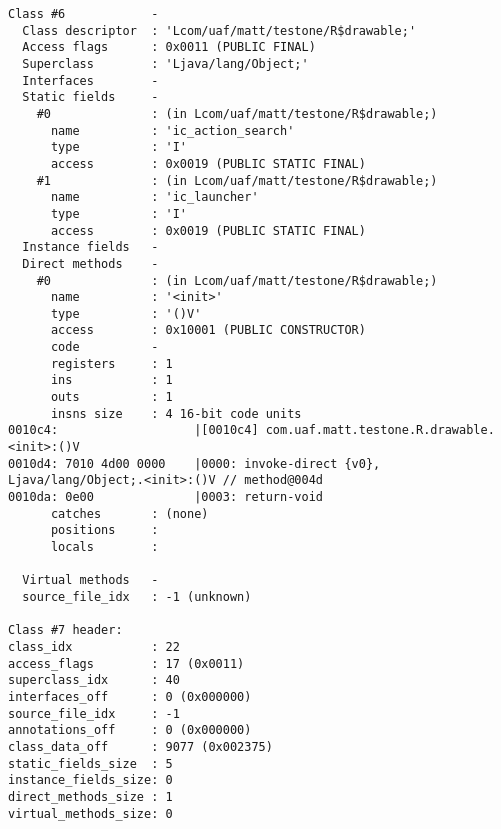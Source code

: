 \begin{lstlisting}
Class #6            -
  Class descriptor  : 'Lcom/uaf/matt/testone/R$drawable;'
  Access flags      : 0x0011 (PUBLIC FINAL)
  Superclass        : 'Ljava/lang/Object;'
  Interfaces        -
  Static fields     -
    #0              : (in Lcom/uaf/matt/testone/R$drawable;)
      name          : 'ic_action_search'
      type          : 'I'
      access        : 0x0019 (PUBLIC STATIC FINAL)
    #1              : (in Lcom/uaf/matt/testone/R$drawable;)
      name          : 'ic_launcher'
      type          : 'I'
      access        : 0x0019 (PUBLIC STATIC FINAL)
  Instance fields   -
  Direct methods    -
    #0              : (in Lcom/uaf/matt/testone/R$drawable;)
      name          : '<init>'
      type          : '()V'
      access        : 0x10001 (PUBLIC CONSTRUCTOR)
      code          -
      registers     : 1
      ins           : 1
      outs          : 1
      insns size    : 4 16-bit code units
0010c4:                   |[0010c4] com.uaf.matt.testone.R.drawable.<init>:()V
0010d4: 7010 4d00 0000    |0000: invoke-direct {v0}, Ljava/lang/Object;.<init>:()V // method@004d
0010da: 0e00              |0003: return-void
      catches       : (none)
      positions     :
      locals        :

  Virtual methods   -
  source_file_idx   : -1 (unknown)

Class #7 header:
class_idx           : 22
access_flags        : 17 (0x0011)
superclass_idx      : 40
interfaces_off      : 0 (0x000000)
source_file_idx     : -1
annotations_off     : 0 (0x000000)
class_data_off      : 9077 (0x002375)
static_fields_size  : 5
instance_fields_size: 0
direct_methods_size : 1
virtual_methods_size: 0


\end{lstlisting}

